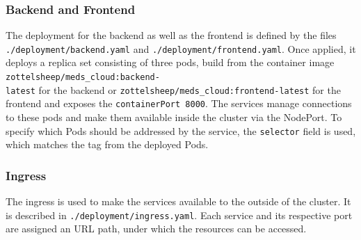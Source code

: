         \subsubsection{Backend and Frontend}
            The deployment for the backend as well as the frontend is defined by the files \texttt{./deployment/backend.yaml} and \texttt{./deployment/frontend.yaml}.
            Once applied, it deploys a replica set consisting of three pods, build from the container image \texttt{zottelsheep/meds\_cloud:backend-\\latest} for the backend
            or \texttt{zottelsheep/meds\_cloud:frontend-latest} for the frontend and exposes the \texttt{containerPort 8000}.
            The services manage connections to these pods and make them available inside the cluster via the NodePort. 
            To specify which Pods should be addressed by the service, the \texttt{selector} field is used, which matches the tag from the deployed Pods.

        \subsubsection{Ingress}
            The ingress is used to make the services available to the outside of the cluster.
            It is described in \texttt{./deployment/ingress.yaml}.
            Each service and its respective port are assigned an URL path, under which the resources can be accessed. 
        
